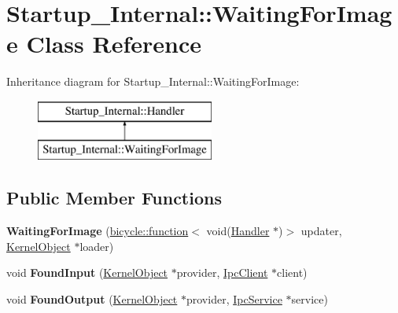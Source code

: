 \hypertarget{class_startup___internal_1_1_waiting_for_image}{}\section{Startup\+\_\+\+Internal\+:\+:Waiting\+For\+Image Class Reference}
\label{class_startup___internal_1_1_waiting_for_image}
Inheritance diagram for Startup\+\_\+\+Internal\+:\+:Waiting\+For\+Image\+:\begin{figure}[H]
\begin{center}
\leavevmode
\includegraphics[height=2.000000cm]{class_startup___internal_1_1_waiting_for_image}
\end{center}
\end{figure}
\subsection*{Public Member Functions}
\begin{DoxyCompactItemize}
\item 
\mbox{\label{class_startup___internal_1_1_waiting_for_image_a576f9b42cac7ce686fce31e7a40dba50}} 
{\bfseries Waiting\+For\+Image} (\hyperlink{classbicycle_1_1function}{bicycle\+::function}$<$ void(\hyperlink{class_startup___internal_1_1_handler}{Handler} $\ast$)$>$ updater, \hyperlink{class_kernel_object}{Kernel\+Object} $\ast$loader)
\item 
\mbox{\label{class_startup___internal_1_1_waiting_for_image_ad87697ce2dc44304fecfc74294611d46}} 
void {\bfseries Found\+Input} (\hyperlink{class_kernel_object}{Kernel\+Object} $\ast$provider, \hyperlink{class_ipc_client}{Ipc\+Client} $\ast$client)
\item 
\mbox{\label{class_startup___internal_1_1_waiting_for_image_a1910e2c33a11833f53223c1479c54b4d}} 
void {\bfseries Found\+Output} (\hyperlink{class_kernel_object}{Kernel\+Object} $\ast$provider, \hyperlink{class_ipc_service}{Ipc\+Service} $\ast$service)
\end{DoxyCompactItemize}

